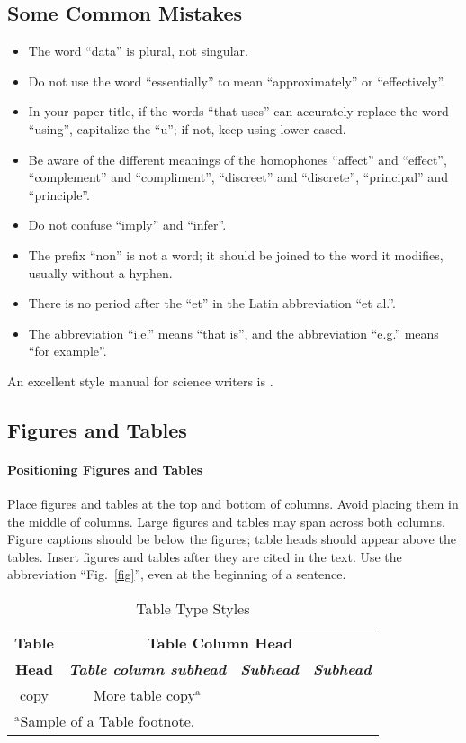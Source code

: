 \documentclass[conference]{IEEEtran}
\begin{document}
	\subsection{Some Common Mistakes}\label{SCM}
	\begin{itemize}
		\item The word ``data'' is plural, not singular.
		\item Do not use the word ``essentially'' to mean ``approximately'' or ``effectively''.
		\item In your paper title, if the words ``that uses'' can accurately replace the word ``using'', capitalize the ``u''; if not, keep using lower-cased.
		\item Be aware of the different meanings of the homophones ``affect'' and ``effect'', ``complement'' and ``compliment'', ``discreet'' and ``discrete'', ``principal'' and ``principle''.
		\item Do not confuse ``imply'' and ``infer''.
		\item The prefix ``non'' is not a word; it should be joined to the word it modifies, usually without a hyphen.
		\item There is no period after the ``et'' in the Latin abbreviation ``et al.''.
		\item The abbreviation ``i.e.'' means ``that is'', and the abbreviation ``e.g.'' means ``for example''.
	\end{itemize}
	An excellent style manual for science writers is \cite{b7}.
	
	
	\subsection{Figures and Tables}
	\paragraph{Positioning Figures and Tables} Place figures and tables at the top and 
	bottom of columns. Avoid placing them in the middle of columns. Large 
	figures and tables may span across both columns. Figure captions should be 
	below the figures; table heads should appear above the tables. Insert 
	figures and tables after they are cited in the text. Use the abbreviation 
	``Fig.~\ref{fig}'', even at the beginning of a sentence.
	
	\begin{table}[htbp]
		\caption{Table Type Styles}
		\begin{center}
			\begin{tabular}{|c|c|c|c|}
				\hline
				\textbf{Table}&\multicolumn{3}{|c|}{\textbf{Table Column Head}} \\
				\cline{2-4} 
				\textbf{Head} & \textbf{\textit{Table column subhead}}& \textbf{\textit{Subhead}}& \textbf{\textit{Subhead}} \\
				\hline
				copy& More table copy$^{\mathrm{a}}$& &  \\
				\hline
				\multicolumn{4}{l}{$^{\mathrm{a}}$Sample of a Table footnote.}
			\end{tabular}
			\label{tab1}
		\end{center}
	\end{table}
	
\end{document}

